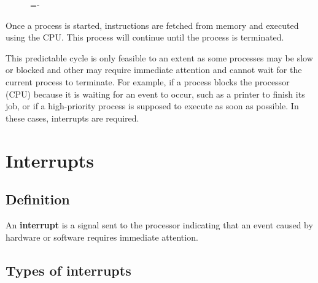 \documentclass[a4paper]{systems-software}
\begin{document}
\begin{figure}[H]
  \lineskip=-\fboxrule
\end{figure}

Once a process is started, instructions are fetched from memory and executed using the CPU. This process will continue until the process is terminated.

This predictable cycle is only feasible to an extent as some processes may be slow or blocked and other may require immediate attention and cannot wait for the current process to terminate. For example, if a process blocks the processor (CPU) because it is waiting for an event to occur, such as a printer to finish its job, or if a high-priority process is supposed to execute as soon as possible. In these cases, interrupts are required.


\section*{Interrupts}

\subsection*{Definition}

An \textbf{interrupt} is a signal sent to the processor indicating that an event caused by hardware or software requires immediate attention.


\subsection*{Types of interrupts}
\end{document}
